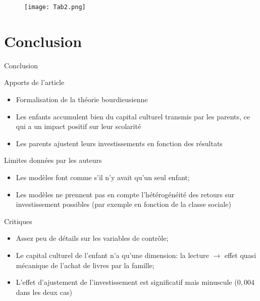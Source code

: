 \documentclass[9pt]{beamer}
\begin{document}
\begin{frame}
	\begin{figure}[h]
		\begin{center}
		\texttt{[image: Tab2.png]}
		\end{center}
	\end{figure}
\end{frame}

\section*{Conclusion}
\begin{frame}{Conclusion}
	\begin{block}{Apports de l'article}
		\begin{itemize}
		\item Formalisation de la théorie bourdieusienne
		\item Les enfants accumulent bien du capital culturel transmis par les parents, ce qui a un impact positif sur leur scolarité
		\item Les parents ajustent leurs \og investissements \fg{} en fonction des résultats
		\end{itemize}
	\end{block}
	\begin{block}{Limites données par les auteurs}
		\begin{itemize}
		\item Les modèles font comme s'il n'y avait qu'un seul enfant;
		\item Les modèles ne prennent pas en compte l'hétérogénéité des \og retours sur investissement \fg{} possibles (par exemple en fonction de la classe sociale)
		\end{itemize}
	\end{block}
	\begin{alertblock}{Critiques}
		\begin{itemize}
		\item Assez peu de détails sur les variables de contrôle;
		\item Le capital culturel de l'enfant n'a qu'une dimension: la lecture $\to$ effet quasi mécanique de l'achat de livres par la famille;
		\item L'effet d'ajustement de l'investissement est significatif mais minuscule ($0,004$ dans les deux cas)
		\end{itemize}
	\end{alertblock}
\end{frame}
\end{document}

